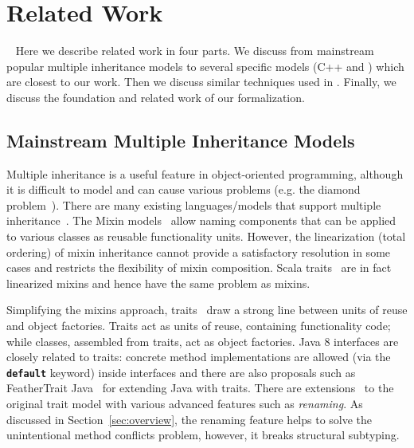 \section{Related Work}~\label{sec:relatedwork}
Here we describe related work in four parts. We discuss from mainstream popular multiple 
inheritance models to several specific models (C++ and \csharp) which are closest to our work. Then we 
discuss similar techniques used in \self. Finally, we discuss the foundation and related work of our formalization.

\subsection{Mainstream Multiple Inheritance Models}
Multiple inheritance is a useful feature in object-oriented
programming, although it is difficult to model and can 
cause various problems (e.g. the diamond problem~\cite{Sak89dis,Singh1995}).  
There are many existing languages/models that support multiple 
inheritance~\cite{ellis1990annotated,scala-overview,bracha90mixin,scharli03traits,malayeri2009cz,csharpdoc,Moon1986,Flatt1998,Ancona2003}. 
The Mixin models~\cite{bracha90mixin,Flatt1998,van1996encapsulation,Ancona2003,Hendler86} allow naming components 
that can be applied to various classes as reusable functionality units. However, the linearization (total ordering) of mixin 
inheritance cannot provide a satisfactory resolution in some cases and restricts the flexibility of mixin composition. 
Scala traits~\cite{scala-overview} are in fact linearized mixins and hence have the same problem as mixins.

Simplifying the mixins approach, traits~\cite{scharli03traits,Ducasse:2006:TMF:1119479.1119483} draw a
strong line between units of reuse and object factories. Traits act
as units of reuse, containing functionality code; while classes,
assembled from traits, act as object factories. Java 8
interfaces are closely related to traits: concrete method
implementations are allowed (via the \textbf{\texttt{default}}
keyword) inside interfaces and there are also proposals such as FeatherTrait Java~\cite{Liquori08ftj} 
for extending Java with traits. There are extensions~\cite{reppy2006foundation,Reppy:2007:MT:2394758.2394784} to 
the original trait model with various advanced features such as \emph{renaming}. As discussed in Section~\ref{sec:overview},
the renaming feature helps to solve the unintentional method conflicts problem, however, it breaks structural subtyping.

\begin{comment}
There are also proposals for extending Java with traits. For example, 
FeatherTrait Java (FTJ) [14] extends FJ [13] with statically-typed traits, 
adding trait-based inheritance in Java. Except for few, mostly syntac- tic details, 
their work can be emulated with Java 8 interfaces. There are also extensions 
to the original trait model, with operations (e.g. renaming [18], which breaks 
structural sub- typing) that default methods and interfaces cannot model.
\end{comment}

